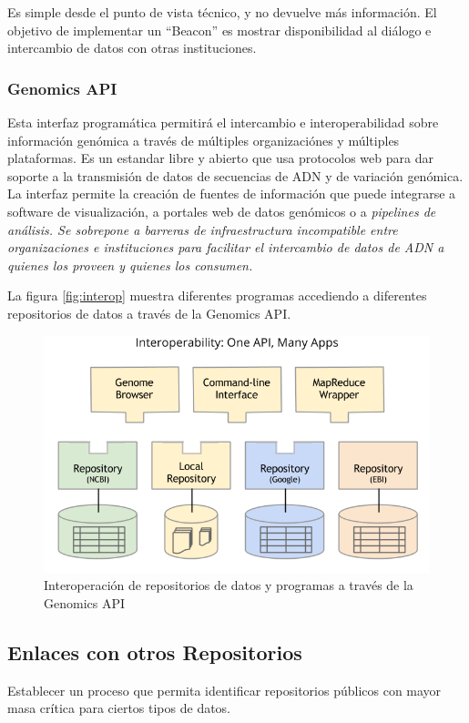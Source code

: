 \documentclass[
10pt, %
letterpaper, %
oneside, %
headinclude,footinclude, %
BCOR5mm, %
]{scrartcl}
\begin{document}
Es simple desde el punto de vista técnico, y no devuelve más
información. El objetivo de implementar un ``Beacon'' es mostrar
disponibilidad al diálogo e intercambio de datos con otras
instituciones.\cite{_ga4gh_????}


\subsubsection{Genomics API}

Esta interfaz programática permitirá el intercambio e
interoperabilidad sobre información genómica a través de múltiples
organizaciónes y múltiples plataformas. Es un estandar libre y abierto
que usa protocolos web para dar soporte a la transmisión de datos de
secuencias de ADN y de variación genómica. La interfaz permite la
creación de fuentes de información que puede integrarse a software de
visualización, a portales web de datos genómicos o a \em{pipelines}\em
de análisis. Se sobrepone a barreras de infraestructura incompatible
entre organizaciones e instituciones para facilitar el intercambio de
datos de ADN a quienes los proveen y quienes los consumen.\cite{_ga4gh_????-1}

La figura \vref{fig:interop} muestra diferentes programas accediendo a
diferentes repositorios de datos a través de la Genomics API.

\begin{figure}
\centering 
\includegraphics[width=0.8\columnwidth]{GA4GH_API_interop.png} 
\caption[]{Interoperación de repositorios de datos y programas a
  través de la Genomics API}
\label{fig:interop} 
\end{figure}



\subsection{Enlaces con otros Repositorios}
Establecer un proceso que permita identificar repositorios públicos
con mayor masa crítica para ciertos tipos de datos.
\end{document}
